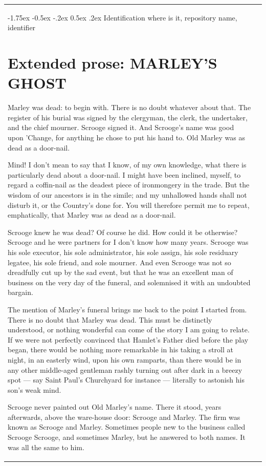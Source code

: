 \documentclass[11pt,twoside]{article}\makeatletter
\makeatletter
\renewcommand\section{\@startsection {section}{1}{\z@}%
     {-1.75ex \@plus -0.5ex \@minus -.2ex}%
     {0.5ex \@plus .2ex}%
     {\reset@font\Large\bfseries\sffamily}}
\def\DivI{\section}
\def\DivI{\chapter}
\makeatother
\begin{document}
\begin{longtable}{P{0.19558457711442787\textwidth}P{0.6544154228855721\textwidth}}
\section{Identification}
where is it, repository name, identifier
\DivI[Extended prose: MARLEY'S GHOST]{Extended prose: MARLEY'S GHOST}\label{S1}\par
Marley was dead: to begin with. There is no doubt whatever about that. The register of his burial was signed by the clergyman, the clerk, the undertaker, and the chief mourner. Scrooge signed it. And Scrooge's name was good upon 'Change, for anything he chose to put his hand to. Old Marley was as dead as a door-nail. \par
Mind! I don't mean to say that I know, of my own knowledge, what there is particularly dead about a door-nail. I might have been inclined, myself, to regard a coffin-nail as the deadest piece of ironmongery in the trade. But the wisdom of our ancestors is in the simile; and my unhallowed  hands shall not disturb it, or the Country's done for. You will therefore permit me to repeat, emphatically, that Marley was as dead as a door-nail.\par
Scrooge knew he was dead? Of course he did. How could it be otherwise? Scrooge and he were partners for I don't know how many years. Scrooge was his sole executor, his sole administrator, his sole assign, his sole residuary legatee, his sole friend, and sole mourner. And even Scrooge was not so dreadfully cut up by the sad event, but that he was an excellent man of business on the very day of the funeral, and solemnised it with an undoubted bargain. \par
The mention of Marley's funeral brings me back to the point I started from. There is no doubt that Marley was dead. This must be distinctly understood, or nothing wonderful can come of the story I am going to relate. If we were not perfectly convinced that Hamlet's Father died before the play began, there would be nothing more remarkable in his taking a stroll at night, in an easterly wind, upon his own ramparts, than there  would be in any other middle-aged gentleman rashly turning out after dark in a breezy spot — say Saint Paul's Churchyard for instance — literally to astonish his son's weak mind.\par
Scrooge never painted out Old Marley's name. There it stood, years afterwards, above the ware-house door: Scrooge and Marley. The firm was known as Scrooge and Marley. Sometimes people new to the business called Scrooge Scrooge, and sometimes Marley, but he answered to both names. It was all the same to him. \par

\end{longtable}
\end{document}
